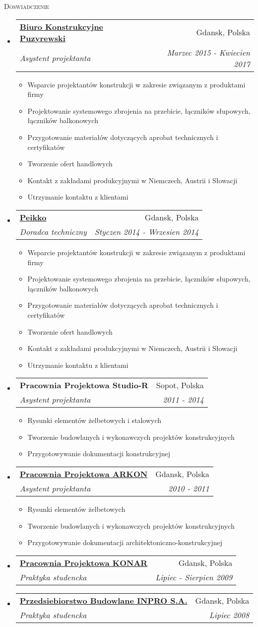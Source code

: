 \documentclass[letterpaper,11pt]{article}
\makeatletter
\newcommand{\resheading}[1]{
  \begin{tcolorbox}
  \textsc{#1}
  \end{tcolorbox}
}
\newcommand{\resitem}[1]{\item #1 \vspace{-2pt}}
\newcommand{\ressubheading}[4]{
\begin{tabular*}{6.5in}{l@{\extracolsep{\fill}}r}
		\textbf{#1} & #2 \\
		\textit{#3} & \textit{#4} \\
\end{tabular*}\vspace{-6pt}}
\makeatother
\begin{document}
\resheading{Doswiadczenie}
\begin{itemize}

\item
  \ressubheading{\href{www.puzyrewski.pl}{Biuro Konstrukcyjne Puzyrewski}}{Gdansk, Polska}{Asystent projektanta}{Marzec 2015 - Kwiecien 2017}
  \begin{itemize}
    \resitem{Wsparcie projektantów konstrukcji w zakresie związanym z produktami firmy}
    \resitem{Projektowanie systemowego zbrojenia na przebicie, łączników słupowych, łączników balkonowych}
    \resitem{Przygotowanie materiałów dotyczących aprobat technicznych i certyfikatów}
    \resitem{Tworzenie ofert handlowych}
    \resitem{Kontakt z zakładami produkcyjnymi w Niemczech, Austrii i Słowacji}
    \resitem{Utrzymanie kontaktu z klientami}
  \end{itemize}

\item
  \ressubheading{\href{www.peikko.pl}{Peikko}}{Gdansk, Polska}{Doradca techniczny}{Styczen 2014 - Wrzesien 2014}
  \begin{itemize}
    \resitem{Wsparcie projektantów konstrukcji w zakresie związanym z produktami firmy}
    \resitem{Projektowanie systemowego zbrojenia na przebicie, łączników słupowych, łączników balkonowych}
    \resitem{Przygotowanie materiałów dotyczących aprobat technicznych i certyfikatów}
    \resitem{Tworzenie ofert handlowych}
    \resitem{Kontakt z zakładami produkcyjnymi w Niemczech, Austrii i Słowacji}
    \resitem{Utrzymanie kontaktu z klientami}
  \end{itemize}

\item 
  \ressubheading{Pracownia Projektowa Studio-R}{Sopot, Polska}{Asystent projektanta}{2011 - 2014}
  \begin{itemize}
    \resitem{Rysunki elementów żelbetowych i stalowych}
    \resitem{Tworzenie budowlanych i wykonawczych projektów konstrukcyjnych}
    \resitem{Przygotowywanie dokumentacji konstrukcyjnej}
  \end{itemize}
  
\item
  \ressubheading{\href{http://www.konar.eu/}{Pracownia Projektowa ARKON}}{Gdansk, Polska}{Asystent projektanta}{2010 - 2011}
  \begin{itemize}
    \resitem{Rysunki elementów żelbetowych}
    \resitem{Tworzenie budowlanych i wykonawczych projektów konstrukcyjnych}
    \resitem{Przygotowywanie dokumentacji architektoniczno-konstrukcyjnej}
  \end{itemize}
  
\item
  \ressubheading{\href{http://www.konar.eu/}{Pracownia Projektowa KONAR}}{Gdansk, Polska}{Praktyka studencka}{Lipiec - Sierpien 2009}

\item
  \ressubheading{\href{https://www.inpro.com.pl}{Przedsiebiorstwo Budowlane INPRO S.A.}}{Gdansk, Polska}{Praktyka studencka}{Lipiec 2008}

\end{itemize}
\end{document}
